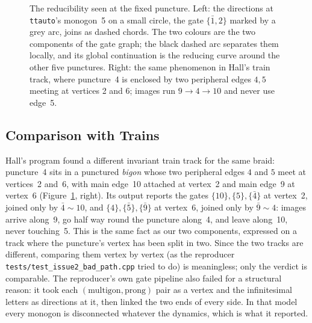 \documentclass[12pt]{amsart}
\newcommand{\anti}[1]{\bar{#1}}          %
\newcommand{\code}[1]{\texttt{#1}}
\newcommand{\Trains}{\textsc{Trains}}
\newcommand{\ttauto}{\texttt{ttauto}}
\newcommand{\set}[1]{\{#1\}}
\theoremstyle{plain}
\theoremstyle{definition}
\begin{document}
\begin{figure}[t]
  \caption{The reducibility seen at the fixed puncture.  Left: the
    directions at \ttauto's monogon~5 on a small circle, the gate
    $\set{\anti1,2}$ marked by a grey arc, joins as dashed chords.  The two
    colours are the two components of the gate graph; the black dashed arc
    separates them locally, and its global continuation is the reducing
    curve around the other five punctures.  Right: the same phenomenon in
    Hall's train track, where puncture~4 is enclosed by two peripheral
    edges $4,5$ meeting at vertices 2 and 6; images run $9\to4\to10$ and
    never use edge~5.}
  \label{fig:badvertex}
\end{figure}

\subsection{Comparison with Trains}
Hall's program found a different invariant train track for the same
braid: puncture~4 sits in a punctured \emph{bigon} whose two peripheral
edges $4$ and $5$ meet at vertices~2 and~6, with main edge~10 attached at
vertex~2 and main edge~9 at vertex~6 (Figure~\ref{fig:badvertex}, right).
Its output reports the gates $\set{10},\set{5},\set{\anti4}$ at vertex~2,
joined only by $\anti4\sim10$, and $\set{4},\set{\anti5},\set{\anti9}$ at
vertex~6, joined only by $\anti9\sim4$: images arrive along~9, go half way
round the puncture along~4, and leave along~10, never touching~5.  This is
the same fact as our two components, expressed on a track where the
puncture's vertex has been split in two.  Since the two tracks are
different, comparing them vertex by vertex (as the reproducer
\code{tests/test\_issue2\_bad\_path.cpp} tried to do) is meaningless; only
the verdict is comparable.  The reproducer's own gate pipeline also failed
for a structural reason: it took each $(\text{multigon},\text{prong})$ pair
as a vertex and the infinitesimal letters as directions at it, then linked
the two ends of every side.  In that model every monogon is disconnected
whatever the dynamics, which is what it reported.
\end{document}
